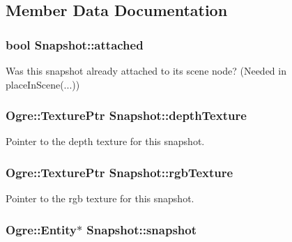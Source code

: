 \subsection{\-Member \-Data \-Documentation}
\hypertarget{classSnapshot_a0c9100c6611542fafa58b9bcde75bc3d}{
\subsubsection[{attached}]{\setlength{\rightskip}{0pt plus 5cm}bool {\bf \-Snapshot\-::attached}}}\label{classSnapshot_a0c9100c6611542fafa58b9bcde75bc3d}
\-Was this snapshot already attached to its scene node? (\-Needed in place\-In\-Scene(...)) \hypertarget{classSnapshot_aa568adf9051f6eb80353f7f1673cdb33}{
\subsubsection[{depth\-Texture}]{\setlength{\rightskip}{0pt plus 5cm}\-Ogre\-::\-Texture\-Ptr {\bf \-Snapshot\-::depth\-Texture}}}\label{classSnapshot_aa568adf9051f6eb80353f7f1673cdb33}
\-Pointer to the depth texture for this snapshot. \hypertarget{classSnapshot_af759834693d9319f38be4e3d3cbe48c0}{
\subsubsection[{rgb\-Texture}]{\setlength{\rightskip}{0pt plus 5cm}\-Ogre\-::\-Texture\-Ptr {\bf \-Snapshot\-::rgb\-Texture}}}\label{classSnapshot_af759834693d9319f38be4e3d3cbe48c0}
\-Pointer to the rgb texture for this snapshot. \hypertarget{classSnapshot_a049a4347e562c85029ddc099dc019e17}{
\subsubsection[{snapshot}]{\setlength{\rightskip}{0pt plus 5cm}\-Ogre\-::\-Entity$\ast$ {\bf \-Snapshot\-::snapshot}}}\label{classSnapshot_a049a4347e562c85029ddc099dc019e17}
